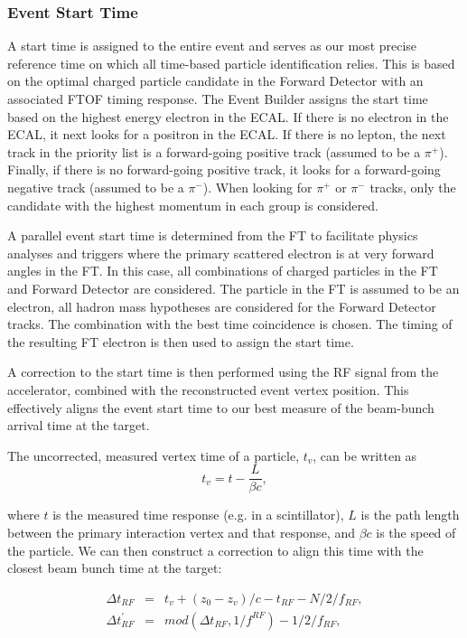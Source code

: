 \subsubsection{Event Start Time}

A start time is assigned to the entire event and serves as our most precise reference time on which all time-based
particle identification relies. This is based on the optimal charged particle candidate in the Forward Detector with
an associated FTOF timing response. The Event Builder assigns the start time based on the highest energy electron
in the ECAL. If there is no electron in the ECAL, it next looks for a positron in the ECAL. If there is no lepton, the
next track in the priority list is a forward-going positive track (assumed to be a $\pi^+$). Finally, if there is no
forward-going positive track, it looks for a forward-going negative track (assumed to be a $\pi^-$). When looking
for $\pi^+$ or $\pi^-$ tracks, only the candidate with the highest momentum in each group is considered.

A parallel event start time is determined from the FT to facilitate physics analyses and triggers where the
primary scattered electron is at very forward angles in the FT. In this case, all combinations of charged
particles in the FT and Forward Detector are considered. The particle in the FT is assumed to be an electron,
all hadron mass hypotheses are considered for the Forward Detector tracks. The combination with the best
time coincidence is chosen. The timing of the resulting FT electron is then used to assign the start time.

A correction to the start time is then performed using the RF signal from the accelerator, combined with the
reconstructed event vertex position. This effectively aligns the event start time to our best measure of the
beam-bunch arrival time at the target.

The uncorrected, measured vertex time of a particle, $t_v$, can be written as
\begin{equation}
    t_v = t-\frac{L}{\beta c},
\end{equation}

\noindent
where $t$ is the measured time response (e.g. in a scintillator), $L$ is the path length between the primary
interaction vertex and that response, and $\beta c$ is the speed of the particle.  We can then construct a
correction to align this time with the closest beam bunch time at the target:

\begin{eqnarray*}
\Delta t_{RF} &=& t_v + (z_0-z_v)/c - t_{RF} - N/2/f_{RF}, \\
\Delta t^{\prime}_{RF} &=& mod(\Delta t_{RF},1/f^{RF})-1/2/f_{RF},
\end{eqnarray*}


